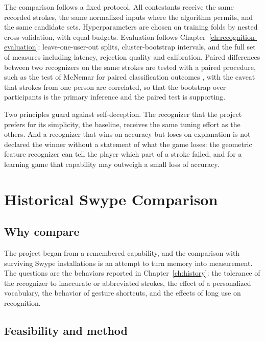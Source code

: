 The comparison follows a fixed protocol. All contestants receive the same recorded strokes, the same normalized inputs where the algorithm permits, and the same candidate sets. Hyperparameters are chosen on training folds by nested cross-validation, with equal budgets. Evaluation follows Chapter~\ref{ch:recognition-evaluation}: leave-one-user-out splits, cluster-bootstrap intervals, and the full set of measures including latency, rejection quality and calibration. Paired differences between two recognizers on the same strokes are tested with a paired procedure, such as the test of McNemar for paired classification outcomes \cite{mcnemar1947},\evD{} with the caveat that strokes from one person are correlated, so that the bootstrap over participants is the primary inference and the paired test is supporting.

Two principles guard against self-deception. The recognizer that the project prefers for its simplicity, the baseline, receives the same tuning effort as the others. And a recognizer that wins on accuracy but loses on explanation is not declared the winner without a statement of what the game loses: the geometric feature recognizer can tell the player which part of a stroke failed, and for a learning game that capability may outweigh a small loss of accuracy.\evS

\chapter{Historical Swype Comparison}\label{ch:swype-comparison}

\section{Why compare}

The project began from a remembered capability, and the comparison with surviving Swype installations is an attempt to turn memory into measurement. The questions are the behaviors reported in Chapter~\ref{ch:history}: the tolerance of the recognizer to inaccurate or abbreviated strokes, the effect of a personalized vocabulary, the behavior of gesture shortcuts, and the effects of long use on recognition.

\section{Feasibility and method}

